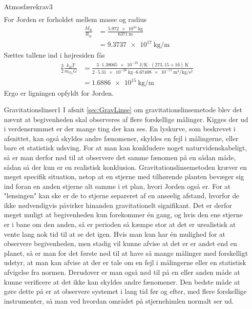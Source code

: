 \begin{opgave}{Atmosfærekrav}{3}
\begin{align}
\end{align}
\opg For Jorden er forholdet mellem masse og radius
\begin{align*}
	\frac{M_\oplus}{R_\oplus} &= \frac{\SI{5,972e24}{\kilo\gram}}{\SI{6371}{\metre}} \\
	&= \SI{9.3737e+17}{\kilo\gram\per\metre}
\end{align*}
Sættes tallene ind i højresiden fås
\begin{align*}
	\frac{3}{2}\frac{k_BT}{m_{O_2}G} &= \frac{3\cdot\SI{1.38065e-23}{\joule\per\kelvin}\cdot(273,15 + 16)\SI{}{\kelvin}}{2\cdot\SI{5,31e-26}{\kilo\gram}\cdot\SI{6.67408e-11}{\metre\cubed\per\kilo\gram\per\second\squared}} \\
	&= \SI{1.6886e+15}{\kilo\gram\per\metre}
\end{align*}
Ergo er ligningen opfyldt for Jorden.
\end{opgave}

\begin{opgave}{Gravitationslinser}{1}
I afsnit \ref{sec:GravLinse} om gravitationslinsemetode blev det nævnt at begivenheden skal observeres af flere forskellige målinger.
\opg Kigges der ud i verdensrummet er der mange ting der kan ses. En lyskurve, som beskrevet i afsnittet, kan også skyldes andre fænomener, skyldes en fejl i målingerne, eller bare et statistisk udsving. For at man kan konkludere noget naturvidenskabeligt, så er man derfor nød til at observere det samme fænomen på en sådan måde, sådan så der kun er en realistisk konklusion.
\opg Gravitationslinsemetoden kræver en meget specifik situation, netop at en stjerne med tilhørende planten bevæger sig ind foran en anden stjerne alt samme i et plan, hvori Jorden også er. For at "lensingen" kan ske er de to stjerne separeret af en anseelig afstand, hvorfor de ikke nødvendigvis påvirker hinanden gravitationelt signifikant. Det er derfor meget muligt at begivenheden kun forekommer én gang, og hvis den ene stjerne er i bane om den anden, så er perioden så kæmpe stor at det er urealistisk at vente lang nok tid til at se det igen.
\opg Hvis man kun har én mulighed for at observere begivenheden, men stadig vil kunne afvise at det er er andet end en planet, så er man for det første nød til at have så mange målinger med forskelligt udstyr, at man kan afvise at der er tale om en fejl i målingerne eller en statistisk afvigelse fra normen. Derudover er man også nød til på en eller anden måde at kunne verificere at det ikke kan skyldes andre fænomener. Den bedste måde at gøre dette på er at observere systemet i lang tid før og efter, med flere forskellige instrumenter, så man ved hvordan området på stjernehimlen normalt ser ud.
\end{opgave}

